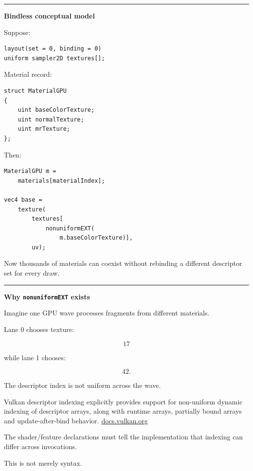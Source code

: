 \begin{center}\rule{0.5\linewidth}{0.5pt}\end{center}

\textbf{Bindless conceptual model}

Suppose:

\begin{verbatim}
layout(set = 0, binding = 0)
uniform sampler2D textures[];
\end{verbatim}

Material record:

\begin{verbatim}
struct MaterialGPU
{
    uint baseColorTexture;
    uint normalTexture;
    uint mrTexture;
};
\end{verbatim}

Then:

\begin{verbatim}
MaterialGPU m =
    materials[materialIndex];

vec4 base =
    texture(
        textures[
            nonuniformEXT(
                m.baseColorTexture)],
        uv);
\end{verbatim}

Now thousands of materials can coexist without rebinding a different descriptor set for every draw.

\begin{center}\rule{0.5\linewidth}{0.5pt}\end{center}

\textbf{Why \texttt{nonuniformEXT} exists}

Imagine one GPU wave processes fragments from different materials.

Lane 0 chooses texture:

\[
17
\]

while lane 1 chooses:

\[
42.
\]

The descriptor index is not uniform across the wave.

Vulkan descriptor indexing explicitly provides support for non-uniform dynamic indexing of descriptor arrays, along with runtime arrays, partially bound arrays and update-after-bind behavior. \href{https://docs.vulkan.org/refpages/latest/refpages/source/VK_EXT_descriptor_indexing.html?utm_source=chatgpt.com}{docs.vulkan.org}

The shader/feature declarations must tell the implementation that indexing can differ across invocations.

This is not merely syntax.

